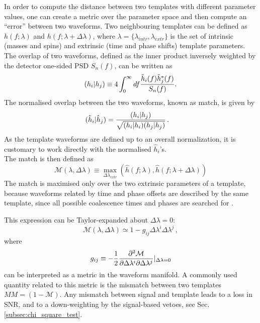 \documentclass[binding=0.6cm, LaM]{sapthesis}
\begin{document}
	In order to compute the distance between two templates with different parameter values, 
	one can create a metric over the parameter space and then compute an ``error'' between two waveforms.
	Two neighbouring templates can be defined as $h(f;\lambda)$ and $h(f;\lambda + \Delta \lambda)$,
        where $\lambda = \{\lambda_{intr}, \lambda_{extr}\}$ is the set of
        intrinsic (masses and spins) and extrinsic (time and phase shifts) template parameters.
	The overlap of two waveforms, defined as the inner product inversely weighted by the detector one-sided PSD $S_n(f)$, 
	can be written as
        \begin{equation}
          (h_i| h_j)  \equiv 4 \int_{0}^{\infty} df {{\tilde h_i(f) \tilde h^*_j(f)} \over {S_n(f)}}.
        \end{equation}
	The normalised overlap between the two waveforms, known as match, is given by
        \begin{align}
          (\hat{h}_i|\hat{h}_j)& = {{(h_i|h_j)} \over {\sqrt{(h_i| h_i)(h_j| h_j)}}}\,.
        \end{align}
	As the template waveforms are defined up to an overall normalization, 
	it is customary to work directly with the normalised $\hat{h}_i$'s. \\
	The match is then defined as
        \begin{equation}
          \mathcal{M}(\lambda, \Delta \lambda) \equiv \max_{\Delta \lambda_{extr}} (\hat h(f;\lambda), \hat h(f;\lambda + \Delta \lambda))
        \end{equation}
	The match is maximised only over the two extrinsic parameters of a template, 
	because waveforms related by time and phase offsets
	are described by the same template, 
	since all possible coalescence times and phases are searched for \cite{29}.

	This expression can be Taylor-expanded about $\Delta \lambda = 0$:
        \begin{equation}
          \mathcal{M}(\lambda, \Delta \lambda) \simeq 1 - g_{ij} \Delta \lambda^i \Delta \lambda^j\,,
        \end{equation}
	where 
        \begin{equation}
          g_{ij} \equiv -{1 \over 2} {{\partial^2\mathcal{M}} \over {\partial  \Delta \lambda^i  \partial \Delta \lambda^j}}\vert_{\Delta \lambda = 0}
        \end{equation}
	can be interpreted as a metric in the waveform manifold.  A commonly used quantity related to this metric
	is the mismatch between two templates $MM = (1 − \mathcal{M})$.
	Any mismatch between signal and template leads to a loss in SNR, 
	and to a down-weighting by the signal-based vetoes, see Sec.\,\ref{subsec:chi_square_test}.
\end{document}
